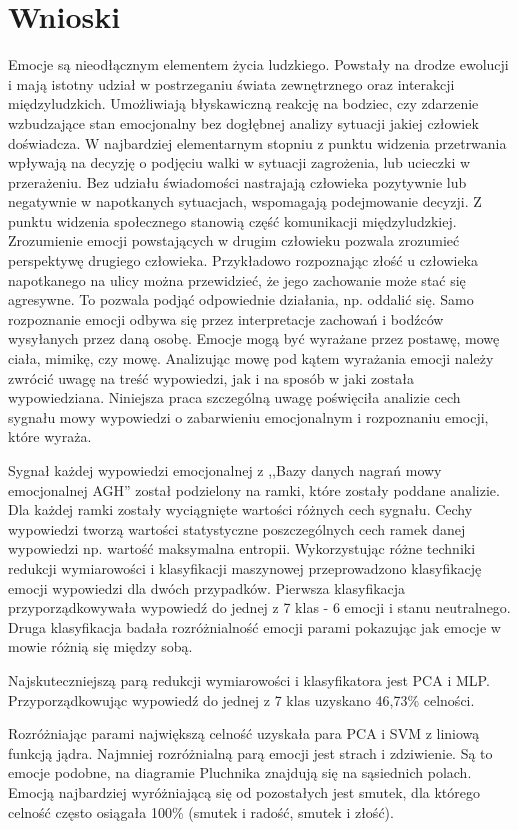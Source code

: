 \documentclass[a4paper,12pt,twoside,openany]{report}
\begin{document}
\chapter{Wnioski}
Emocje są nieodłącznym elementem życia ludzkiego. 
Powstały na drodze ewolucji i mają istotny udział w postrzeganiu świata zewnętrznego oraz interakcji międzyludzkich.
Umożliwiają błyskawiczną reakcję na bodziec, czy zdarzenie wzbudzające stan emocjonalny bez dogłębnej analizy sytuacji jakiej człowiek doświadcza.
W najbardziej elementarnym stopniu z punktu widzenia przetrwania wpływają na decyzję o podjęciu walki w sytuacji zagrożenia, lub ucieczki w przerażeniu.
Bez udziału świadomości nastrajają człowieka pozytywnie lub negatywnie w napotkanych sytuacjach, wspomagają podejmowanie decyzji.
Z punktu widzenia społecznego stanowią część komunikacji międzyludzkiej.
Zrozumienie emocji powstających w drugim człowieku pozwala zrozumieć perspektywę drugiego człowieka.
Przykładowo rozpoznając złość u człowieka napotkanego na ulicy można przewidzieć, że jego zachowanie może stać się agresywne.
To pozwala podjąć odpowiednie działania, np. oddalić się.
Samo rozpoznanie emocji odbywa się przez interpretacje zachowań i bodźców wysyłanych przez daną osobę.
Emocje mogą być wyrażane przez postawę, mowę ciała, mimikę, czy mowę.
Analizując mowę pod kątem wyrażania emocji należy zwrócić uwagę na treść wypowiedzi, jak i na sposób w jaki została wypowiedziana.
Niniejsza praca szczególną uwagę poświęciła analizie cech sygnału mowy wypowiedzi o zabarwieniu emocjonalnym i rozpoznaniu emocji, które wyraża.

Sygnał każdej wypowiedzi emocjonalnej z ,,Bazy danych nagrań mowy emocjonalnej AGH'' został podzielony na ramki, które zostały poddane analizie.
Dla każdej ramki zostały wyciągnięte wartości różnych cech sygnału. 
Cechy wypowiedzi tworzą wartości statystyczne poszczególnych cech ramek danej wypowiedzi np. wartość maksymalna entropii.
Wykorzystując różne techniki redukcji wymiarowości i klasyfikacji maszynowej przeprowadzono klasyfikację emocji wypowiedzi dla dwóch przypadków.
Pierwsza klasyfikacja przyporządkowywała wypowiedź do jednej z 7 klas - 6 emocji i stanu neutralnego.
Druga klasyfikacja badała rozróżnialność emocji parami pokazując jak emocje w mowie różnią się między sobą.

Najskuteczniejszą parą redukcji wymiarowości i klasyfikatora jest PCA i MLP. 
Przyporządkowując wypowiedź do jednej z 7 klas uzyskano 46,73\% celności.

Rozróżniając parami największą celność uzyskała para PCA i SVM z liniową funkcją jądra.
Najmniej rozróżnialną parą emocji jest strach i zdziwienie. 
Są to emocje podobne, na diagramie Pluchnika znajdują się na sąsiednich polach.
Emocją najbardziej wyróżniającą się od pozostałych jest smutek, 
dla którego celność często osiągała 100\% (smutek i radość, smutek i złość).


{}
\end{document}
